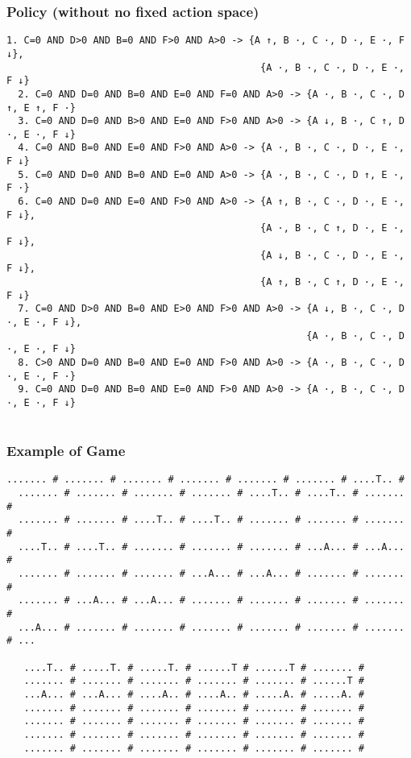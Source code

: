 \documentclass[a4paper]{article}
\begin{document}
\subsubsection{Policy (without no fixed action space)}
\begin{Verbatim}[fontsize=\footnotesize]
  1. C=0 AND D>0 AND B=0 AND F>0 AND A>0 -> {A ↑, B ·, C ·, D ·, E ·, F ↓},
                                            {A ·, B ·, C ·, D ·, E ·, F ↓}
  2. C=0 AND D=0 AND B=0 AND E=0 AND F=0 AND A>0 -> {A ·, B ·, C ·, D ↑, E ↑, F ·}
  3. C=0 AND D=0 AND B>0 AND E=0 AND F>0 AND A>0 -> {A ↓, B ·, C ↑, D ·, E ·, F ↓}
  4. C=0 AND B=0 AND E=0 AND F>0 AND A>0 -> {A ·, B ·, C ·, D ·, E ·, F ↓}
  5. C=0 AND D=0 AND B=0 AND E=0 AND A>0 -> {A ·, B ·, C ·, D ↑, E ·, F ·}
  6. C=0 AND D=0 AND E=0 AND F>0 AND A>0 -> {A ↑, B ·, C ·, D ·, E ·, F ↓},
                                            {A ·, B ·, C ↑, D ·, E ·, F ↓},
                                            {A ↓, B ·, C ·, D ·, E ·, F ↓},
                                            {A ↑, B ·, C ↑, D ·, E ·, F ↓}
  7. C=0 AND D>0 AND B=0 AND E>0 AND F>0 AND A>0 -> {A ↓, B ·, C ·, D ·, E ·, F ↓},
                                                    {A ·, B ·, C ·, D ·, E ·, F ↓}
  8. C>0 AND D=0 AND B=0 AND E=0 AND F>0 AND A>0 -> {A ·, B ·, C ·, D ·, E ·, F ·}
  9. C=0 AND D=0 AND B=0 AND E=0 AND F>0 AND A>0 -> {A ·, B ·, C ·, D ·, E ·, F ↓}


\end{Verbatim}

\subsubsection{Example of Game}
\begin{Verbatim}[fontsize=\footnotesize]
  ....... # ....... # ....... # ....... # ....... # ....... # ....T.. #
  ....... # ....... # ....... # ....... # ....T.. # ....T.. # ....... #
  ....... # ....... # ....T.. # ....T.. # ....... # ....... # ....... #
  ....T.. # ....T.. # ....... # ....... # ....... # ...A... # ...A... #
  ....... # ....... # ....... # ...A... # ...A... # ....... # ....... #
  ....... # ...A... # ...A... # ....... # ....... # ....... # ....... #
  ...A... # ....... # ....... # ....... # ....... # ....... # ....... # ...

   ....T.. # .....T. # .....T. # ......T # ......T # ....... #
   ....... # ....... # ....... # ....... # ....... # ......T #
   ...A... # ...A... # ....A.. # ....A.. # .....A. # .....A. #
   ....... # ....... # ....... # ....... # ....... # ....... #
   ....... # ....... # ....... # ....... # ....... # ....... #
   ....... # ....... # ....... # ....... # ....... # ....... #
   ....... # ....... # ....... # ....... # ....... # ....... #
\end{Verbatim}
\end{document}
